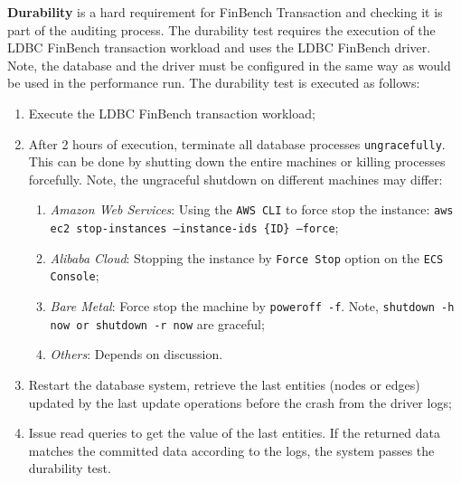   {\bf Durability} is a hard requirement for FinBench Transaction and checking it
is part of the auditing process. The durability test requires the execution of
the LDBC FinBench transaction workload and uses the LDBC FinBench driver. Note,
the database and the driver must be configured in the same way as would be used
in the performance run. The durability test is executed as follows:

\begin{enumerate}[label={(\roman*)}]
  \item Execute the LDBC FinBench transaction workload;
  \item After 2 hours of execution, terminate all database processes
        \texttt{ungracefully}. This can be done by shutting down the entire
        machines or killing processes forcefully. Note, the ungraceful shutdown
        on different machines may differ:
        \begin{enumerate}[label={(\alph*)}]
          \item \emph{Amazon Web Services}: Using the \texttt{AWS CLI} to force
                stop the instance:
                \texttt{aws ec2 stop-instances --instance-ids \{ID\} --force};
          \item \emph{Alibaba Cloud}: Stopping the instance by \texttt{Force Stop}
                option on the \texttt{ECS Console};
          \item \emph{Bare Metal}: Force stop the machine by \texttt{poweroff -f}.
                Note, \texttt{shutdown -h now or shutdown -r now} are graceful;
          \item \emph{Others}: Depends on discussion.
        \end{enumerate}
  \item Restart the database system, retrieve the last entities (nodes or edges)
        updated by the last update operations before the crash from the driver
        logs;
  \item Issue read queries to get the value of the last entities. If the returned
        data matches the committed data according to the logs, the system
        passes the durability test.
\end{enumerate}

